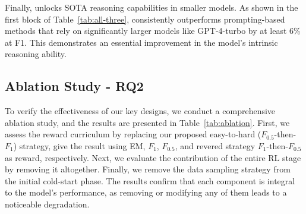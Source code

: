 Finally, \ours \space unlocks SOTA reasoning capabilities in smaller models. As shown in the first block of Table~\ref{tab:all-three}, \ours \space consistently outperforms prompting-based methods that rely on significantly larger models like GPT-4-turbo by at least 6\% at F1. This demonstrates an essential improvement in the model's intrinsic reasoning ability.

\begin{table}[!t]
  \centering
  \caption{Ablation Study on Three KBQA Datasets.}
  \label{tab:ablation}
\end{table}
\subsection{Ablation Study - RQ2}
To verify the effectiveness of our key designs, we conduct a comprehensive ablation study, and the results are presented in Table~\ref{tab:ablation}. First, we assess the reward curriculum by replacing our proposed easy-to-hard ($F_{0.5}$-then-$F_{1}$) strategy, give the result using EM, $F_1$, $F_{0.5}$, and revered strategy $F_1$-then-$F_{0.5}$ as reward, respectively. Next, we evaluate the contribution of the entire RL stage by removing it altogether. Finally, we remove the data sampling strategy from the initial cold-start phase. The results confirm that each component is integral to the model's performance, as removing or modifying any of them leads to a noticeable degradation.

